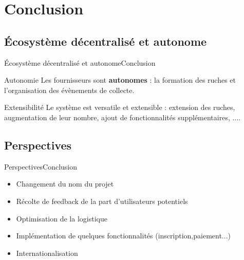 \documentclass[usenames,dvipsnames]{beamer}
\begin{document}
\section{Conclusion}
\subsection{Écosystème décentralisé et autonome}
\begin{frame}{Écosystème décentralisé et autonome}{Conclusion}

\begin{block}{Autonomie}
Les fournisseurs sont \textbf{autonomes} : la formation des ruches et l'organisation des évènements de collecte.
\end{block}

\begin{block}{Extensibilité}
Le système est versatile et extensible : extension des ruches, augmentation de leur nombre, ajout de fonctionnalités supplémentaires, $\dots$.
\end{block}

\end{frame}

\subsection{Perspectives}
\begin{frame}{Perspectives}{Conclusion}
 \begin{itemize}
   \item Changement du nom du projet
   \item Récolte de feedback de la part d'utilisateurs potentiels
   \item Optimisation de la logistique 
   \item Implémentation de quelques fonctionnalités (inscription,paiement...)
   \item Internationalisation
 \end{itemize}
\end{frame}
\end{document}
